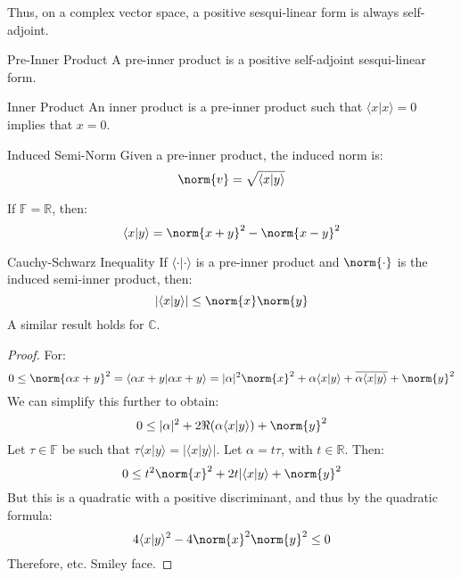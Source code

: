     Thus, on a complex vector space, a positive sesqui-linear
    form is always self-adjoint.
    \begin{ldefinition}{Pre-Inner Product}
        A pre-inner product is a positive self-adjoint
        sesqui-linear form.
    \end{ldefinition}
    \begin{ldefinition}{Inner Product}
        An inner product is a pre-inner product such that
        $\langle{x|x}\rangle=0$ implies that $x=0$.
    \end{ldefinition}
    \begin{ldefinition}{Induced Semi-Norm}
        Given a pre-inner product, the induced norm is:
        \begin{equation}
            \norm{v}=\sqrt{\langle{x|y}\rangle}
        \end{equation}
    \end{ldefinition}
    If $\mathbb{F}=\mathbb{R}$, then:
    \begin{equation}
        \langle{x|y}\rangle=\norm{x+y}^{2}-\norm{x-y}^{2}
    \end{equation}
    \begin{ltheorem}{Cauchy-Schwarz Inequality}
        If $\langle{\cdot|\cdot}\rangle$ is a pre-inner product
        and $\norm{\cdot}$ is the induced semi-inner product,
        then:
        \begin{equation}
            |\langle{x|y}\rangle|\leq\norm{x}\norm{y}
        \end{equation}
        A similar result holds for $\mathbb{C}$.
    \end{ltheorem}
    \begin{proof}
        For:
        \begin{equation}
            0\leq\norm{\alpha{x}+y}^{2}
            =\langle{\alpha{x}+y|\alpha{x}+y}\rangle
            =|\alpha|^{2}\norm{x}^{2}
            +\alpha\langle{x|y}\rangle
            +\overline{\alpha\langle{x|y}\rangle}+\norm{y}^{2}
        \end{equation}
        We can simplify this further to obtain:
        \begin{equation}
            0\leq|\alpha|^{2}+2\Re(\alpha\langle{x|y}\rangle)
                +\norm{y}^{2}
        \end{equation}
        Let $\tau\in\mathbb{F}$ be such that
        $\tau\langle{x|y}\rangle=|\langle{x|y}\rangle|$.
        Let $\alpha=t\tau$, with $t\in\mathbb{R}$. Then:
        \begin{equation}
            0\leq{t}^{2}\norm{x}^{2}+2t|\langle{x|y}\rangle
                +\norm{y}^{2}
        \end{equation}
        But this is a quadratic with a positive discriminant,
        and thus by the quadratic formula:
        \begin{equation}
            4\langle{x|y}\rangle^{2}-4\norm{x}^{2}\norm{y}^{2}
            \leq{0}
        \end{equation}
        Therefore, etc. Smiley face.
    \end{proof}
